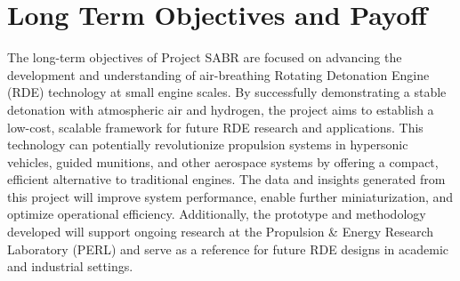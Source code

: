 \section*{Long Term Objectives and Payoff}

The long-term objectives of Project SABR are focused on advancing the development and understanding of air-breathing Rotating Detonation Engine (RDE) technology at small engine scales. By successfully demonstrating a stable detonation with atmospheric air and hydrogen, the project aims to establish a low-cost, scalable framework for future RDE research and applications. This technology can potentially revolutionize propulsion systems in hypersonic vehicles, guided munitions, and other aerospace systems by offering a compact, efficient alternative to traditional engines. The data and insights generated from this project will improve system performance, enable further miniaturization, and optimize operational efficiency. Additionally, the prototype and methodology developed will support ongoing research at the Propulsion \& Energy Research Laboratory (PERL) and serve as a reference for future RDE designs in academic and industrial settings.